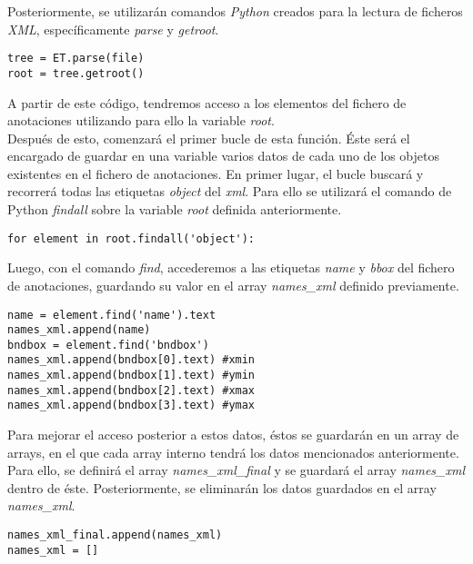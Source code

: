 \documentclass[a4paper, 12pt, oneside]{book}
\begin{document}
Posteriormente, se utilizarán comandos \textit{Python} creados para la lectura de ficheros \textit{XML}, específicamente \textit{parse} y \textit{getroot}.\\

\begin{lstlisting}[frame=single]
tree = ET.parse(file)
root = tree.getroot()
\end{lstlisting}

A partir de este código, tendremos acceso a los elementos del fichero de anotaciones utilizando para ello la variable \textit{root}.\\

Después de esto, comenzará el primer bucle de esta función. Éste será el encargado de guardar en una variable varios datos de cada uno de los objetos existentes en el fichero de anotaciones. En primer lugar, el bucle buscará y recorrerá todas las etiquetas \textit{object} del \textit{xml}. Para ello se utilizará el comando de Python \textit{findall} sobre la variable \textit{root} definida anteriormente.\\

\begin{lstlisting}[frame=single]
for element in root.findall('object'):
\end{lstlisting}

Luego, con el comando \textit{find}, accederemos a las etiquetas \textit{name} y \textit{bbox} del fichero de anotaciones, guardando su valor en el array \textit{names\_xml} definido previamente.\\

\begin{lstlisting}[frame=single]
name = element.find('name').text
names_xml.append(name)
bndbox = element.find('bndbox')
names_xml.append(bndbox[0].text) #xmin
names_xml.append(bndbox[1].text) #ymin
names_xml.append(bndbox[2].text) #xmax
names_xml.append(bndbox[3].text) #ymax
\end{lstlisting}

Para mejorar el acceso posterior a estos datos, éstos se guardarán en un array de arrays, en el que cada array interno tendrá los datos mencionados anteriormente. Para ello, se definirá el array \textit{names\_xml\_final} y se guardará el array \textit{names\_xml} dentro de éste. Posteriormente, se eliminarán los datos guardados en el array \textit{names\_xml}.

\begin{lstlisting}[frame=single]
names_xml_final.append(names_xml)
names_xml = []
\end{lstlisting}
\end{document}
